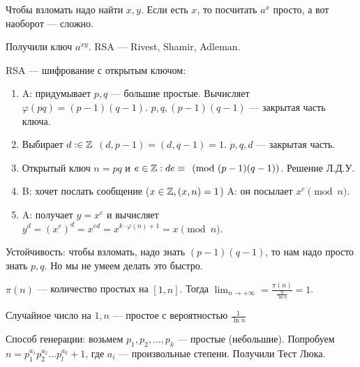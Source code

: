 Чтобы взломать надо найти $x, y$. Если есть  $x$, то посчитать  $a^x$ просто, а вот наоборот --- сложно.

Получили ключ  $a^{xy}$.
RSA --- Rivest, Shamir, Adleman.

RSA --- шифрование с открытым ключом:
\begin{enumerate}
    \item A: придумывает $p, q$ --- большие простые. Вычисляет  $\varphi(pq) = (p-1)(q-1)$.  $p, q, (p-1)(q-1)$ --- закрытая часть ключа. 
    \item Выбирает  $d: \in \mathbb{Z}$  $(d, p - 1) = (d, q - 1) = 1$.  $p, q, d$ --- закрытая часть.
    \item Открытый ключ $n = pq$ и  $e \in \mathbb{Z}: de \equiv \pmod{(p-1)(q-1)}$. Решение Л.Д.У.
    \item B: хочет послать сообщение ($x \in \mathbb{Z}, (x, n) = 1$) A: он посылает $x^e \pmod n$.
    \item  A: получает  $y=x^e$ и вычисляет  $y^d = (x^e)^d = x^{ed} = x^{k \cdot \varphi(n) + 1} = x \pmod{n}$.
\end{enumerate}

Устойчивость: чтобы взломать, надо знать $(p-1)(q-1)$, то нам надо просто знать $p, q$. Но мы не умеем делать это быстро.
 \begin{theorem}
     $\pi(n)$ --- количество простых на  $[1, n]$. Тогда  $\lim_{n \to +\infty} = \frac{\pi(n)}{\frac{n}{\ln n}} = 1$.
\end{theorem}
\begin{consequence}
   Случайное число на $1, n$ --- простое с вероятностью  $\frac{1}{\ln n}$ 
\end{consequence}

Способ генерации: возьмем $p_1, p_2,\ldots,p_k$ --- простые (небольшие). Попробуем $n = p_1^{a_1}p_2^{a_2}\ldots p_l^{a_k} + 1$, где $a_i$ --- произвольные степени. Получили Тест Люка.

